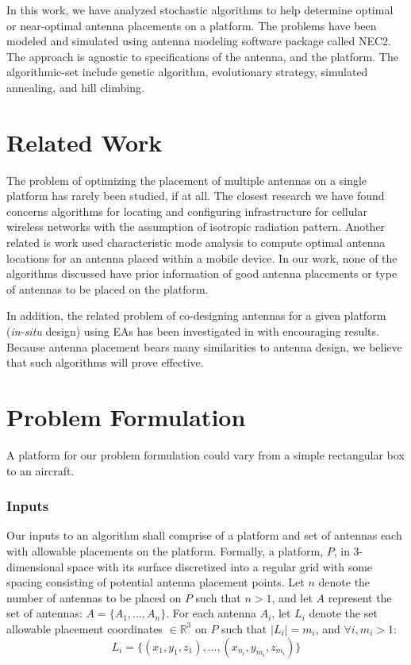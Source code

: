 \documentclass{sig-alternate}
\begin{document}
In this work, we have analyzed stochastic algorithms to help determine optimal or near-optimal antenna placements on a platform. The problems have been modeled and simulated using antenna modeling software package called NEC2. The approach is agnostic to specifications of the antenna, and the platform. The algorithmic-set include genetic algorithm, evolutionary strategy, simulated annealing, and hill climbing.

\section{Related Work}
\label{sec:related}
The problem of optimizing the placement of multiple antennas on a single platform has rarely been studied, if at all.  The closest research we have found concerns algorithms for locating and configuring infrastructure  for cellular wireless networks with the assumption of isotropic radiation pattern.  Another related is work used characteristic mode analysis to compute optimal antenna locations for an antenna placed within a mobile device. In our work, none of the algorithms discussed have prior information of good antenna placements or type of antennas to be placed on the platform.

In addition, the related problem of co-designing antennas for a given platform ({\em in-situ} design) using EAs has been investigated in \cite{linden2000wire} with encouraging results. Because antenna placement bears many similarities to antenna design, we believe that such algorithms will prove effective.

\section{Problem Formulation}
\label{sec:problem}
A platform for our problem formulation could vary from a simple rectangular box to an aircraft. 
\subsubsection{Inputs}
\label{sec:inputs}
Our inputs to an algorithm shall comprise of a platform and set of antennas each with allowable placements on the platform. Formally, a platform, $P$, in 3-dimensional space with its surface discretized into a regular grid with some spacing consisting of potential antenna placement points. Let $n$ denote the number of antennas to be placed on $P$ such that $n>1$, and let $A$ represent the set of antennas: $A = \{A_1, ..., A_n\}$.  For each antenna $A_i$, let $L_i$ denote the set allowable placement coordinates $\in \mathbb R^3$ on $P$ such that $\mid L_i \mid =m_i$, and $ \forall i, m_i>1$:
\[
L_i = \{(x_{1}, y_{1}, z_{1}), ..., (x_{n_i}, y_{m_i}, z_{m_i})\}
\]
\end{document}
